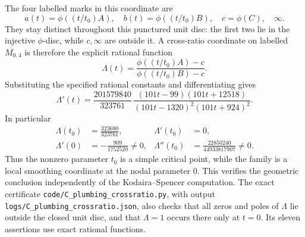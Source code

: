 The four labelled marks in this coordinate are
\[
 a(t)=\phi((t/t_0)A),\quad
 b(t)=\phi((t/t_0)B),\quad c=\phi(C),\quad\infty.
\]
They stay distinct throughout this punctured unit disc: the first two lie in the injective $\phi$-disc, while $c,\infty$ are outside it. A cross-ratio coordinate on labelled $M_{0,4}$ is therefore the explicit rational function
\[
 \Lambda(t)=\frac{\phi((t/t_0)A)-c}{\phi((t/t_0)B)-c}.
\]
Substituting the specified rational constants and differentiating gives
\[
 \Lambda'(t)=\frac{201579840}{323761}\,
 \frac{(101t-99)(101t+12518)}
 {(101t-1320)^2(101t+924)^2}.
\]
In particular
\begin{align*}
 \Lambda(t_0)&=\frac{323680}{323761},
 &\Lambda'(t_0)&=0,\\
 \Lambda'(0)&=-\frac{909}{1752520}\ne0,
 &\Lambda''(t_0)&=\frac{22850240}{44933817907}\ne0.
\end{align*}
Thus the nonzero parameter $t_0$ is a simple critical point, while the family is a local smoothing coordinate at the nodal parameter $0$. This verifies the geometric conclusion independently of the Kodaira--Spencer computation. The exact certificate \texttt{code/C\_plumbing\_crossratio.py}, with output \texttt{logs/C\_plumbing\_crossratio.json}, also checks that all zeros and poles of $\Lambda$ lie outside the closed unit disc, and that $\Lambda=1$ occurs there only at $t=0$. Its eleven assertions use exact rational functions.
